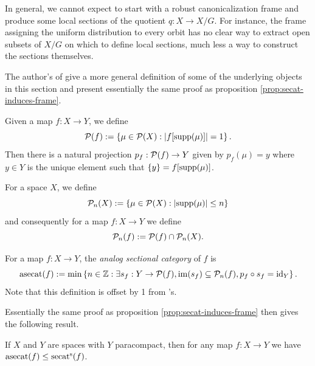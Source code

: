 In general, we cannot expect to start with a robust canonicalization frame and produce some local sections of the quotient $q : X \to X/G$.
For instance, the frame assigning the uniform distribution to every orbit has no clear way to extract open subsets of $X/G$ on which to define local sections, much less a way to construct the sections themselves.


The author's of \cite{knudsen2024analogcategorycomplexity} give a more general definition of some of the underlying objects in this section and present essentially the same proof as proposition \ref{prop:secat-induces-frame}.


\begin{definition}
    Given a map $f : X \to Y$, we define
    \[
        \mathcal{P}(f)
        := \left\{ \mu \in \mathcal{P}(X) : \left| f[\operatorname{supp} (\mu)] \right| = 1 \right\}.
    \]
    Then there is a natural projection $p_f : \mathcal{P}(f) \to Y$ given by $p_f(\mu) = y$ where $y \in Y$ is the unique element such that $\left\{ y \right\} = f[\operatorname{supp} (\mu)]$.
\end{definition}


\begin{definition}
    For a space $X$, we define
    \[
        \mathcal{P}_n(X) := \left\{ \mu \in \mathcal{P}(X) : \left| \operatorname{supp}(\mu) \right| \leq n \right\}
    \]
    and consequently for a map $f : X \to Y$ we define
    \[
        \mathcal{P}_n(f) := \mathcal{P}(f) \cap \mathcal{P}_n(X).
    \]
\end{definition}


\begin{definition}
    For a map $f : X \to Y$, the \emph{analog sectional category} of $f$ is
    \[
        \operatorname{asecat}(f) := \min \left\{ n \in \mathbb{Z} : \exists s_f : Y \to \mathcal{P}(f), \operatorname{im} (s_f) \subseteq \mathcal{P}_n(f), p_f \circ s_f = \operatorname{id}_Y \right\}.
    \]
    Note that this definition is offset by 1 from \cite{knudsen2024analogcategorycomplexity}'s.
\end{definition}


Essentially the same proof as proposition \ref{prop:secat-induces-frame} then gives the following result.


\begin{theorem}\label{thm:asecat-leq-secat}
    If $X$ and $Y$ are spaces with $Y$ paracompact, then for any map $f : X \to Y$ we have $\operatorname{asecat}(f) \leq \operatorname{secat^s}(f)$.
\end{theorem}


